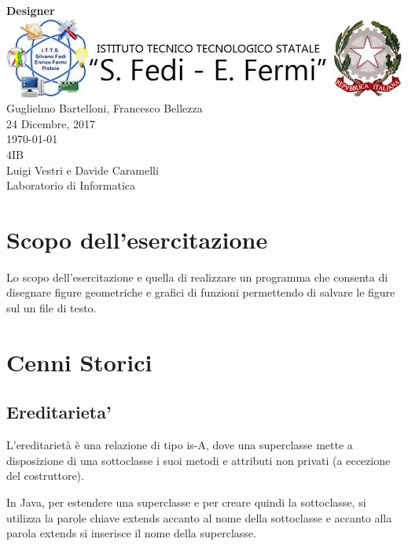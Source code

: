\documentclass[a4paper,12pt]{article}
\author{Guglielmo Bartelloni}
\begin{document}
%
%
\begin{titlepage}
\begin{center}
	\vspace{1cm}
	\textbf{\huge{Designer}}\\ 
	\vspace{1cm}
	\includegraphics[scale=0.7]{logoITTS.jpg}\\
	\vspace{1cm}
	\large{Guglielmo Bartelloni, Francesco Bellezza}\\
	\vspace{0.5cm}
	24 Dicembre, 2017\\
	\today\\
	\vspace{0.5cm}
	\vspace{0.5cm}
	4IB\\
	Luigi Vestri e Davide Caramelli\\
	\vspace{1cm}
	\Large{Laboratorio di Informatica}
\end{center}
\end{titlepage}
\vspace*{1cm}
\tableofcontents
\clearpage
%
%
\section{Scopo dell'esercitazione}
Lo scopo dell'esercitazione e quella di realizzare un programma che consenta di disegnare figure geometriche e grafici di funzioni permettendo di salvare le figure sul un file di testo.

\section{Cenni Storici}


\subsection{Ereditarieta'}
L’ereditarietà è una relazione di tipo is-A, dove una superclasse mette a disposizione di una sottoclasse i suoi metodi e attributi non privati (a eccezione del costruttore).

In Java, per estendere una superclasse e per creare quindi la sottoclasse, si utilizza la parole chiave extends accanto al nome della sottoclasse e accanto alla parola extends si inserisce il nome della superclasse.
\end{document}

